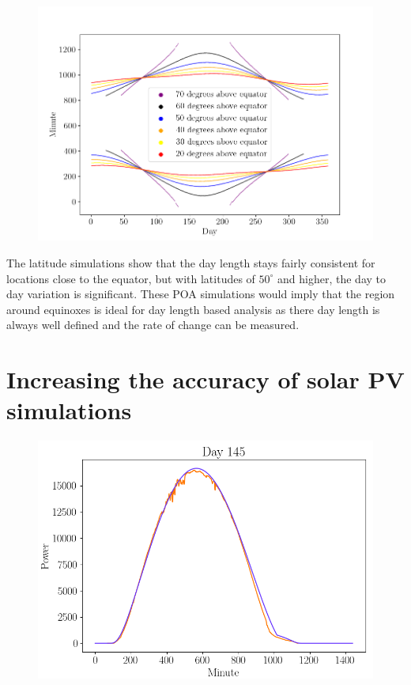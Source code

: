 \begin{figure}[ht!]
\centering
\includegraphics[width=1\linewidth]{pics/poa_var_lat}
\label{fig_poa_var_lat}
\end{figure}

\noindent The latitude simulations show that the day length stays fairly consistent for locations close to the equator, but with latitudes of $50^\circ$ and higher, the day to day variation is significant. These POA simulations would imply that the region around equinoxes is ideal for day length based analysis as there day length is always well defined and the rate of change can be measured. 


\newpage

\section{Increasing the accuracy of solar PV simulations}
\label{section_increased_accuracy_simulations}


\begin{figure}[h]
\centering
\includegraphics[width=0.7\linewidth]{pics/poa_eval_single_day}
\label{fig-poa_eval_single_day}
\end{figure}

